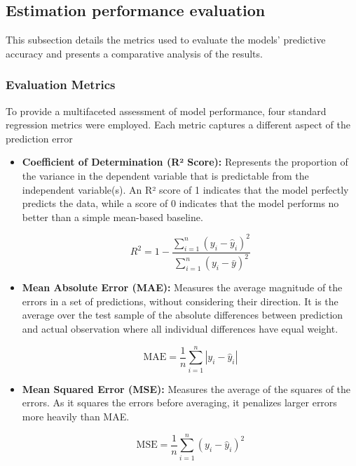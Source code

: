 \documentclass{cys}
\begin{document}
\begin{enumerate}
\subsection{Estimation performance evaluation}
This subsection details the metrics used to evaluate the models' predictive accuracy and presents a comparative analysis of the results.

\subsubsection{Evaluation Metrics}

    To provide a multifaceted assessment of model performance, four standard regression metrics were employed. Each metric captures a different aspect of the prediction error
    \begin{itemize}
        \item \textbf{Coefficient of Determination (R² Score):}
        Represents the proportion of the variance in the dependent variable that is predictable from the independent variable(s). An R² score of 1 indicates that the model perfectly predicts the data, while a score of 0 indicates that the model performs no better than a simple mean-based baseline.

        \begin{equation*}
             R^2 = 1 - \frac{\sum_{i=1}^{n} (y_i - \hat{y}_i)^2}{\sum_{i=1}^{n} (y_i - \bar{y})^2}
        \end{equation*}
      
        \item \textbf{Mean Absolute Error (MAE):}
        Measures the average magnitude of the errors in a set of predictions, without considering their direction. It is the average over the test sample of the absolute differences between prediction and actual observation where all individual differences have equal weight.

        \begin{equation*}
            \text{MAE} = \frac{1}{n} \sum_{i=1}^{n} |y_i - \hat{y}_i|
        \end{equation*}

        \item \textbf{Mean Squared Error (MSE):}
        Measures the average of the squares of the errors. As it squares the errors before averaging, it penalizes larger errors more heavily than MAE.

        \begin{equation*}
            \text{MSE} = \frac{1}{n} \sum_{i=1}^{n} (y_i - \hat{y}_i)^2
        \end{equation*}
        

\end{itemize}
\end{enumerate}
\end{document}
